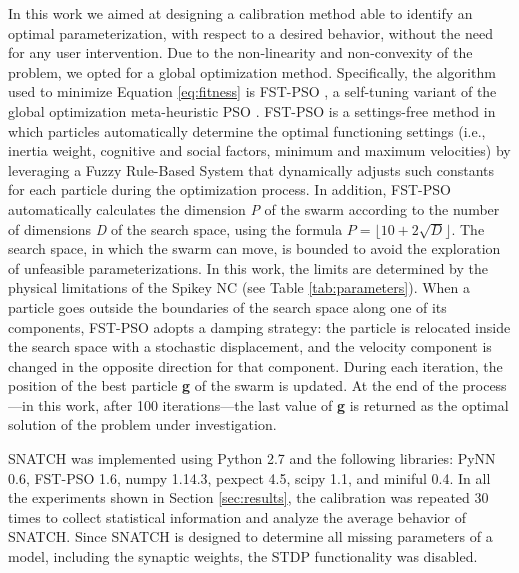 \documentclass[utf8]{frontiersFPHY} %
\newcommand {\name}{SNATCH}
\begin{document}
In this work we aimed at designing a calibration method able to identify an optimal parameterization, with respect to a desired behavior, without the need for any user intervention. 
Due to the non-linearity and non-convexity of the problem, we opted for a global optimization method. Specifically, the algorithm used to minimize Equation \ref{eq:fitness} is FST-PSO \cite{Nobile2018}, a self-tuning variant of the global optimization meta-heuristic PSO \cite{Kennedy1995}.
FST-PSO is a settings-free method in which particles automatically determine the optimal functioning settings (i.e., inertia weight, cognitive and social factors, minimum and maximum velocities) by leveraging a Fuzzy Rule-Based System that dynamically adjusts such constants for each particle during the optimization process. 
In addition, FST-PSO  automatically calculates the dimension \textit{P} of the swarm according to the number of dimensions \textit{D} of the search space, using the formula $\textit{P} = \lfloor 10 + 2\sqrt{\textit{D}}\rfloor$. 
The search space, in which the swarm can move, is bounded to avoid the exploration of unfeasible parameterizations.
In this work, the limits are determined by the physical limitations of the Spikey NC (see Table \ref{tab:parameters}).
When a particle goes outside the boundaries of the search space along one of its components, FST-PSO adopts  a damping strategy: the particle is relocated inside the search space with a stochastic displacement, and the velocity component is changed in the opposite direction for that component. 
During each iteration, the position of the best particle \textbf{g} of the swarm  is updated.
At the end of the process---in this work, after 100 iterations---the last value of \textbf{g} is returned as the optimal solution of the problem under investigation.

\name{} was implemented using Python 2.7 and the following libraries:  PyNN 0.6, FST-PSO 1.6, numpy 1.14.3, pexpect 4.5, scipy 1.1, and miniful 0.4.
In all the experiments shown in Section \ref{sec:results}, the calibration was repeated 30 times to collect statistical information and analyze the average behavior of \name{}.
Since SNATCH is designed to determine all missing parameters of a model, including the synaptic weights, the STDP functionality was disabled.
\end{document}
